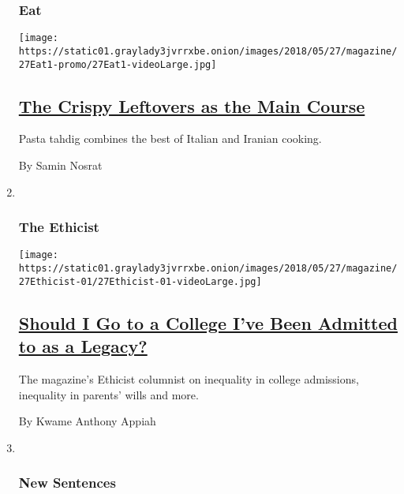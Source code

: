 \begin{enumerate}
{  \subsubsection{Eat}\label{eat}}

  \texttt{[image: https://static01.graylady3jvrrxbe.onion/images/2018/05/27/magazine/27Eat1-promo/27Eat1-videoLarge.jpg]}

  \hypertarget{the-crispy-leftovers-as-the-main-course}{%
  \subsection{\texorpdfstring{\href{/2018/05/22/magazine/pasta-tahdig-crispy-leftovers-main-course-noodles-persian-italian.html}{The
  Crispy Leftovers as the Main
  Course}}{The Crispy Leftovers as the Main Course}}\label{the-crispy-leftovers-as-the-main-course}}

  Pasta tahdig combines the best of Italian and Iranian cooking.

  By Samin Nosrat
\item ~
  \hypertarget{the-ethicist}{%
  \subsubsection{The Ethicist}\label{the-ethicist}}

  \texttt{[image: https://static01.graylady3jvrrxbe.onion/images/2018/05/27/magazine/27Ethicist-01/27Ethicist-01-videoLarge.jpg]}

  \hypertarget{should-i-go-to-a-college-ive-been-admitted-to-as-a-legacy}{%
  \subsection{\texorpdfstring{\href{/2018/05/22/magazine/should-i-go-to-a-college-ive-been-admitted-to-as-a-legacy.html}{Should
  I Go to a College I've Been Admitted to as a
  Legacy?}}{Should I Go to a College I've Been Admitted to as a Legacy?}}\label{should-i-go-to-a-college-ive-been-admitted-to-as-a-legacy}}

  The magazine's Ethicist columnist on inequality in college admissions,
  inequality in parents' wills and more.

  By Kwame Anthony Appiah
\item ~
  \hypertarget{new-sentences}{%
  \subsubsection{New Sentences}\label{new-sentences}}


\end{enumerate}
